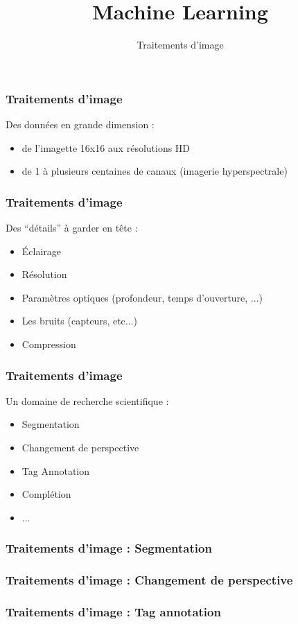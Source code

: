 \documentclass{formation}
\title{Machine Learning}
\subtitle{Traitements d'image}
\begin{document}
\maketitle

\begin{frame}
  \frametitle{Traitements d'image}
  Des données en grande dimension :
  \begin{itemize}
  \item de l'imagette 16x16 aux résolutions HD
  \item de 1 à plusieurs centaines de canaux (imagerie hyperspectrale)
  \end{itemize}
\end{frame}

\begin{frame}
  \frametitle{Traitements d'image}
  Des ``détails'' à garder en tête :
  \begin{itemize}
  \item Éclairage
  \item Résolution
  \item Paramètres optiques (profondeur, temps d'ouverture, ...)
  \item Les bruits (capteurs, etc...)
  \item Compression
  \end{itemize}
\end{frame}

\begin{frame}
  \frametitle{Traitements d'image}
  Un domaine de recherche scientifique :
  \begin{itemize}
  \item Segmentation
  \item Changement de perspective
  \item Tag Annotation
  \item Complétion
  \item ...
  \end{itemize}
\end{frame}

\begin{frame}
  \frametitle{Traitements d'image : Segmentation}
\end{frame}

\begin{frame}
  \frametitle{Traitements d'image : Changement de perspective}
\end{frame}

\begin{frame}
  \frametitle{Traitements d'image : Tag annotation}
\end{frame}
\end{document}
